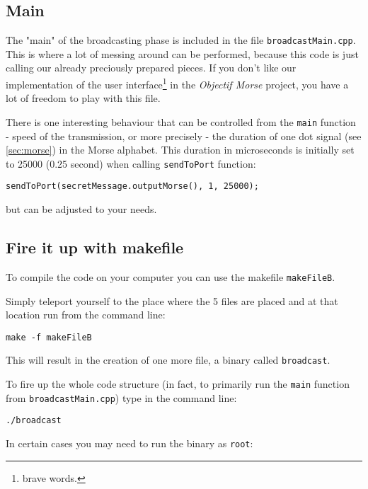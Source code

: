 \documentclass[12pt]{report}
\begin{document}
\subsection{Main}

The "main" of the broadcasting phase is included in the file \verb|broadcastMain.cpp|. This is where a lot of messing around can be performed, because this code is just calling our already preciously prepared pieces. If you don't like our implementation of the user interface\footnote{brave words.} in the \textit{Objectif Morse} project, you have a lot of freedom to play with this file.

There is one interesting behaviour that can be controlled from the \verb|main| function - speed of the transmission, or more precisely - the duration of one dot signal (see \ref{sec:morse}) in the Morse alphabet. This duration in microseconds is initially set to 25000 (0.25 second) when calling \verb|sendToPort| function: 

\begin{lstlisting}
sendToPort(secretMessage.outputMorse(), 1, 25000);
\end{lstlisting}

but can be adjusted to your needs.

\subsection{Fire it up with makefile}

To compile the code on your computer you can use the makefile \verb|makeFileB|.

Simply teleport yourself to the place where the 5 files are placed and at that location run from the command line:

\begin{snugshade}
\verb|make -f makeFileB|
\end{snugshade}

This will result in the creation of one more file, a binary called \verb|broadcast|.

To fire up the whole code structure (in fact, to primarily run the \verb|main| function from \verb|broadcastMain.cpp|) type in the command line:

\begin{snugshade}
\verb|./broadcast|
\end{snugshade}

\newpage

In certain cases you may need to run the binary as \verb|root|:
\end{document}
